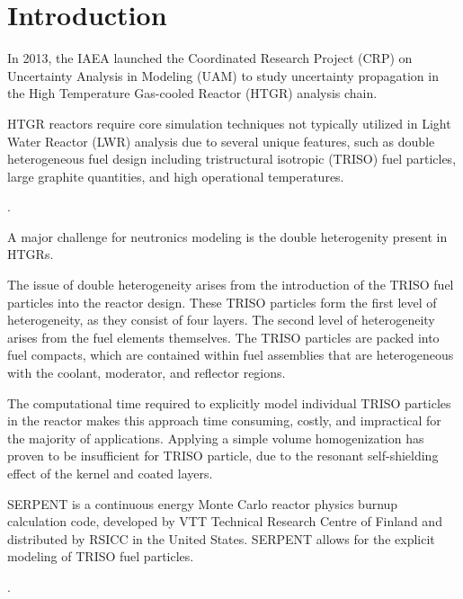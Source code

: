\documentclass[11pt,letterpaper]{article}
\begin{document}

\section{Introduction}

In 2013, the IAEA launched the Coordinated Research Project (CRP) on Uncertainty Analysis in Modeling (UAM) to study uncertainty propagation in the High Temperature Gas-cooled Reactor (HTGR) analysis chain.

HTGR reactors require core simulation techniques not typically utilized in Light Water Reactor (LWR) analysis due to several unique features, such as double heterogeneous fuel design including tristructural isotropic (TRISO) fuel particles, large graphite quantities, and high operational temperatures.

\cite{bostelmann_criticality_2016}.

A major challenge for neutronics modeling is the double heterogenity present in HTGRs.

The issue of double heterogeneity arises from the introduction of the TRISO fuel particles into the reactor design.
These TRISO particles form the first level of heterogeneity, as they consist of four layers.
The second level of heterogeneity arises from the fuel elements themselves.
The TRISO particles are packed into fuel compacts, which are contained within fuel assemblies that are heterogeneous with the coolant, moderator, and reflector regions.

The computational time required to explicitly model individual TRISO particles in the reactor makes this approach time consuming, costly, and impractical for the majority of applications.
Applying a simple volume homogenization has proven to be insufficient for TRISO particle, due to the resonant self-shielding effect of the kernel and coated layers.

SERPENT is a continuous energy Monte Carlo reactor physics burnup calculation code, developed by VTT Technical Research Centre of Finland and distributed by RSICC in the United States.
SERPENT allows for the explicit modeling of TRISO fuel particles.

\cite{rahnema_whitepaper_2015}.
\end{document}
